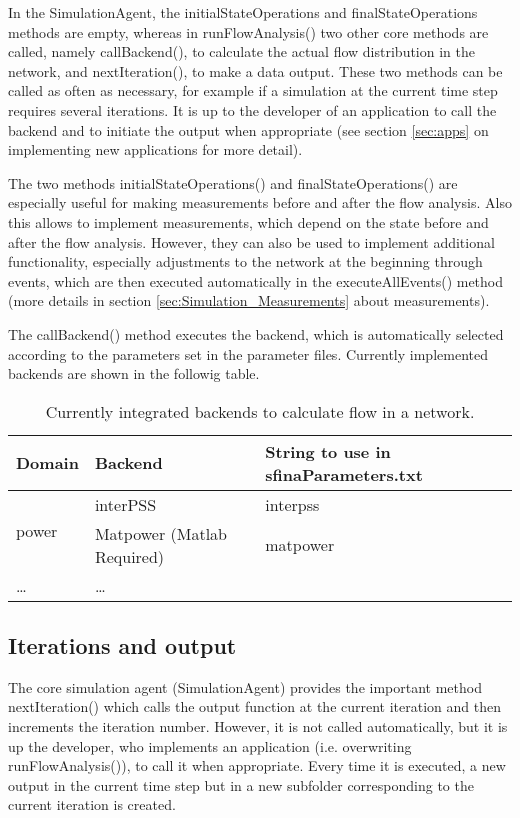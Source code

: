 \documentclass[11pt,fleqn]{book} %
\begin{document}
In the SimulationAgent, the initialStateOperations and finalStateOperations methods are empty, whereas in runFlowAnalysis() two other core methods are called, namely callBackend(), to calculate the actual flow distribution in the network, and nextIteration(), to make a data output. These two methods can be called as often as necessary, for example if a simulation at the current time step requires several iterations. It is up to the developer of an application to call the backend and to initiate the output when appropriate (see section \ref{sec:apps} on implementing new applications for more detail).

The two methods initialStateOperations() and finalStateOperations() are especially useful for making measurements before and after the flow analysis. Also this allows to implement measurements, which depend on the state before and after the flow analysis. However, they can also be used to implement additional functionality, especially adjustments to the network at the beginning through events, which are then executed automatically in the executeAllEvents() method (more details in section \ref{sec:Simulation_Measurements} about measurements).

The callBackend() method executes the backend, which is automatically selected according to the parameters set in the parameter files. Currently implemented backends are shown in the followig table.
\begin{table}[h]
	\centering
	\begin{tabular}{|l| l |l|}
	\hline
	\rowcolor{Gray}
	\textbf{Domain}&\textbf{Backend}&\textbf{String to use in sfinaParameters.txt}\\
	\hline
	\multirow{2}{*}{power}&interPSS & interpss\\
	\cline{2-3}
	& Matpower (Matlab Required)& matpower\\
	\hline
	\dots & \dots & \\
	\hline
	\end{tabular}
	\label{table:backends}
	\caption{Currently integrated backends to calculate flow in a network.}
\end{table}

\subsection{Iterations and output}
The core simulation agent (SimulationAgent) provides the important method nextIteration() which calls the output function at the current iteration and then increments the iteration number. However, it is not called automatically, but it is up the developer, who implements an application (i.e. overwriting runFlowAnalysis()), to call it when appropriate. Every time it is executed, a new output in the current time step but in a new subfolder corresponding to the current iteration is created.
\end{document}
